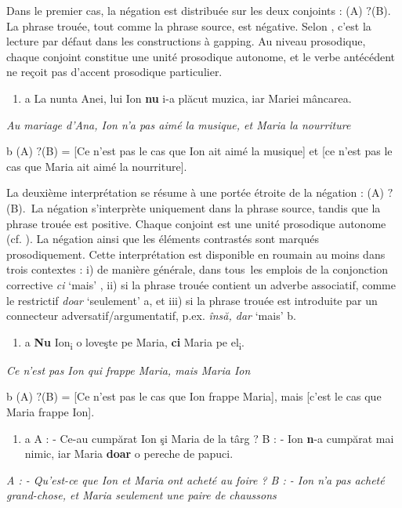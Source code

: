 Dans le premier cas, la négation est distribuée sur les deux conjoints : ({\textlnot}A) ${?}$({\textlnot}B). La phrase trouée, tout comme la phrase source, est négative. Selon \citet{Repp2009}, c'est la lecture par défaut dans les constructions à gapping. Au niveau prosodique, chaque conjoint constitue une unité prosodique autonome, et le verbe antécédent ne reçoit pas d'accent prosodique particulier. 


\begin{enumerate}
\item a  La nunta Anei, lui Ion \textbf{nu} i-a plăcut muzica, iar Mariei mâncarea.


\end{enumerate}
{\itshape
Au mariage d'Ana, Ion n'a pas aimé la musique, et Maria la nourriture}

  b  ({\textlnot}A) ${?}$({\textlnot}B) = [Ce n'est pas le cas que Ion ait aimé la musique] et [ce n'est pas le cas que Maria ait aimé la nourriture].

La deuxième interprétation se résume à une portée étroite de la négation : ({\textlnot}A) ${?}$(B).~La négation s'interprète uniquement dans la phrase source, tandis que la phrase trouée est positive. Chaque conjoint est une unité prosodique autonome (cf. \citet{Oehrle1987}). La négation ainsi que les éléments contrastés sont marqués prosodiquement. Cette interprétation est disponible en roumain au moins dans trois contextes : i) de manière générale, dans tous~les emplois de la conjonction corrective \textit{ci} `mais' , ii) si la phrase trouée contient un adverbe associatif, comme le restrictif \textit{doar} `seulement' a, et iii) si la phrase trouée est introduite par un connecteur adversatif/argumentatif, p.ex. \textit{însă, dar} `mais' b.


\begin{enumerate}
\item \label{bkm:Ref302299588}a  \textbf{Nu} Ion\textsubscript{i} o loveşte pe Maria, \textbf{ci} Maria pe el\textsubscript{i}.


\end{enumerate}
{\itshape
Ce n'est pas Ion qui frappe Maria, mais Maria Ion}

  b  ({\textlnot}A) ${?}$(B) = [Ce n'est pas le cas que Ion frappe Maria], mais [c'est le cas que Maria frappe Ion].


\begin{enumerate}
\item \label{bkm:Ref289301786}a  A : - Ce-au cumpărat Ion şi Maria de la târg ? B : - Ion \textbf{n}-a cumpărat mai nimic, iar Maria \textbf{doar} o pereche de papuci.


\end{enumerate}
{\itshape
A : - Qu'est-ce que Ion et Maria ont acheté au foire ? B : - Ion n'a pas acheté grand-chose, et Maria seulement une paire de chaussons } 

